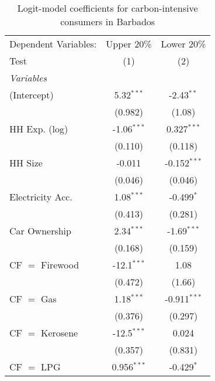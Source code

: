 
\begin{table}[htbp!]
   \centering
   \small
   \begin{adjustbox}{width = 1\textwidth, max height = 0.95\textheight, center}
      \begin{threeparttable}[b]
         \caption{\label{tab:Logit_1_BRB} Logit-model coefficients for carbon-intensive consumers in Barbados}
         \begin{tabular}{lcc}
            \tabularnewline \midrule \midrule
            Dependent Variables: & Upper 20\%    & Lower 20\%\\   
            Test                 & (1)           & (2)\\  
            \midrule
            \emph{Variables}\\
            (Intercept)          & 5.32$^{***}$  & -2.43$^{**}$\\   
                                 & (0.982)       & (1.08)\\   
            HH Exp. (log)        & -1.06$^{***}$ & 0.327$^{***}$\\   
                                 & (0.110)       & (0.118)\\   
            HH Size              & -0.011        & -0.152$^{***}$\\   
                                 & (0.046)       & (0.046)\\   
            Electricity Acc.     & 1.08$^{***}$  & -0.499$^{*}$\\   
                                 & (0.413)       & (0.281)\\   
            Car Ownership        & 2.34$^{***}$  & -1.69$^{***}$\\   
                                 & (0.168)       & (0.159)\\   
            CF $=$ Firewood      & -12.1$^{***}$ & 1.08\\   
                                 & (0.472)       & (1.66)\\   
            CF $=$ Gas           & 1.18$^{***}$  & -0.911$^{***}$\\   
                                 & (0.376)       & (0.297)\\   
            CF $=$ Kerosene      & -12.5$^{***}$ & 0.024\\   
                                 & (0.357)       & (0.831)\\   
            CF $=$ LPG           & 0.956$^{***}$ & -0.429$^{*}$\\   

\end{tabular}
\end{threeparttable}
\end{adjustbox}
\end{table}
